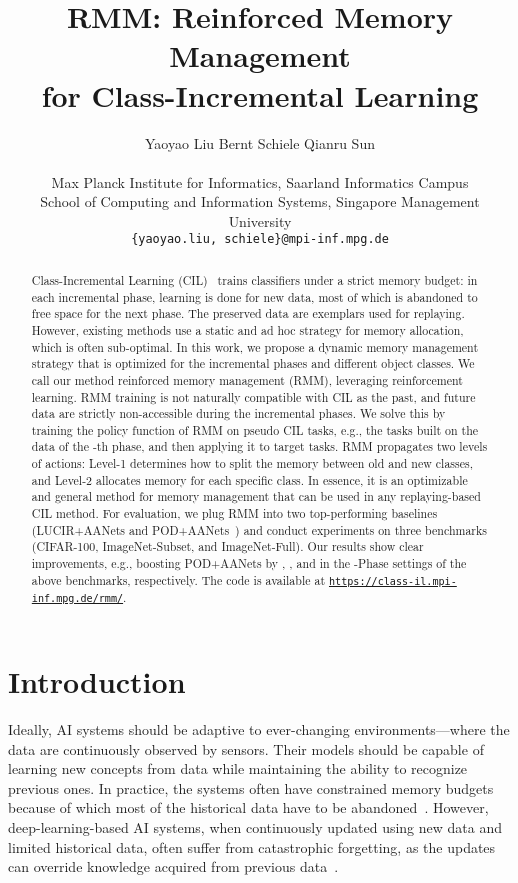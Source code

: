 \documentclass{article}
\title{RMM: Reinforced Memory Management
\\for Class-Incremental Learning}
\author{Yaoyao Liu 
\quad Bernt Schiele 
\quad Qianru Sun\\
\\
\small Max Planck Institute for Informatics, Saarland Informatics Campus\\
\small School of Computing and Information Systems, Singapore Management University\\
\small {\texttt{\{yaoyao.liu, schiele\}@mpi-inf.mpg.de}}  \quad  {\texttt{qianrusun@smu.edu.sg}}
}
\begin{document}
\maketitle

\begin{abstract}

Class-Incremental Learning (CIL)~\cite{rebuffi2017icarl} trains classifiers under a strict memory budget: in each incremental phase, learning is done for new data, most of which is abandoned to free space for the next phase. The preserved data are exemplars used for replaying. However, existing methods use a static and ad hoc strategy for memory allocation, which is often sub-optimal. In this work, we propose a dynamic memory management strategy that is optimized for the incremental phases and different object classes. We call our method reinforced memory management (RMM), leveraging reinforcement learning. RMM training is not naturally compatible with CIL as the past, and future data are strictly non-accessible during the incremental phases. We solve this by training the policy function of RMM on pseudo CIL tasks, e.g., the tasks built on the data of the -th phase, and then applying it to target tasks. RMM propagates two levels of actions: Level-1 determines how to split the memory between old and new classes, and Level-2 allocates memory for each specific class. In essence, it is an optimizable and general method for memory management that can be used in any replaying-based CIL method. For evaluation, we plug RMM into two top-performing baselines (LUCIR+AANets and POD+AANets~\cite{Liu2020AANets}) and conduct experiments on three benchmarks (CIFAR-100, ImageNet-Subset, and ImageNet-Full). Our results show clear improvements, e.g., boosting POD+AANets by , , and  in the -Phase settings of the above benchmarks, respectively.  The
code is available at \texttt{\href{https://class-il.mpi-inf.mpg.de/rmm/}{https://class-il.mpi-inf.mpg.de/rmm/}}.

\end{abstract}
 \section{Introduction}
\label{sec_introduction}

Ideally, AI systems should be adaptive to ever-changing environments---where the data are continuously observed by sensors. Their models should be capable of learning new concepts from data while maintaining the ability to recognize previous ones. In practice, the systems often have constrained memory budgets because of which most of the historical data have to be abandoned~\cite{hu2021cil}. However, deep-learning-based AI systems, when continuously updated using new data and limited historical data, often suffer from catastrophic forgetting, as the updates can override knowledge acquired from previous data~\cite{mccloskey1989catastrophic, McRae1993Catastrophic, Ratcliff1990catastrophic}.
\end{document}
